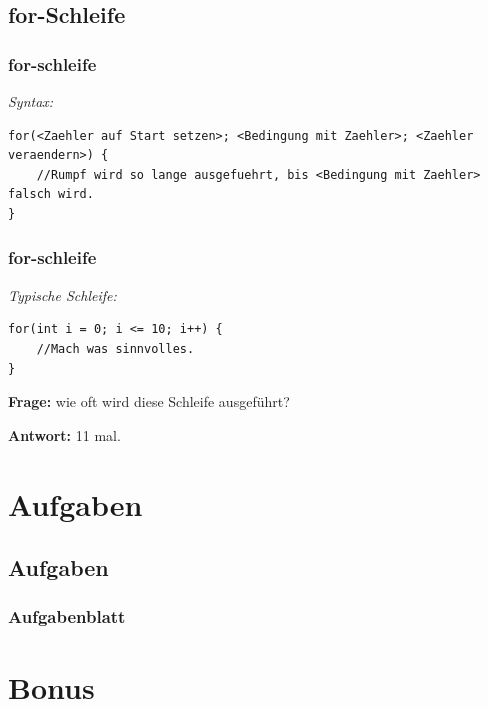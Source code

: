 \documentclass[18pt]{beamer}
\begin{document}
\subsection{for-Schleife}
\begin{frame}[containsverbatim]
	\frametitle{for-schleife}
	
	\emph{Syntax:}
	\begin{lstlisting}
for(<Zaehler auf Start setzen>; <Bedingung mit Zaehler>; <Zaehler veraendern>) {
	//Rumpf wird so lange ausgefuehrt, bis <Bedingung mit Zaehler> falsch wird.
}
	\end{lstlisting}
	
\end{frame}
\begin{frame}[containsverbatim]
	\frametitle{for-schleife}	
	\emph{Typische Schleife:}
	\begin{lstlisting}
for(int i = 0; i <= 10; i++) {
	//Mach was sinnvolles.
}
	\end{lstlisting} \pause
	
	\textbf{Frage:} wie oft wird diese Schleife ausgeführt? \pause
	
	\textbf{Antwort:} 11 mal.
\end{frame}


\section{Aufgaben}
\subsection{Aufgaben} %
\begin{frame}
	\frametitle{Aufgabenblatt}
\end{frame}


\section{Bonus}
\end{document}
